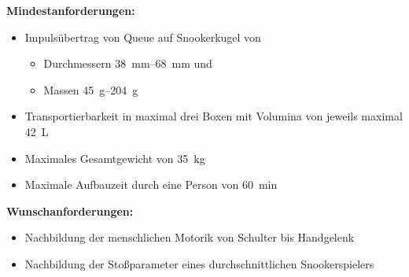 		\textbf{Mindestanforderungen:}
		\begin{itemize}
			\item Impulsübertrag von Queue auf Snookerkugel von
			\begin{itemize}
				\item Durchmessern \SIrange{38}{68}{\milli\metre} und
				\item Massen \SIrange{45}{204}{\gram}
			\end{itemize}
			\item Transportierbarkeit in maximal drei Boxen mit Volumina von jeweils maximal \SI{42}{L}
			\item Maximales Gesamtgewicht von \SI{35}{\kilo\gram}
			\item Maximale Aufbauzeit durch eine Person von \SI{60}{\minute}
		\end{itemize}

		\textbf{Wunschanforderungen:}
		\begin{itemize}
			\item Nachbildung der menschlichen Motorik von Schulter bis Handgelenk
			\item Nachbildung der Stoßparameter eines durchschnittlichen Snookerspielers
		\end{itemize}